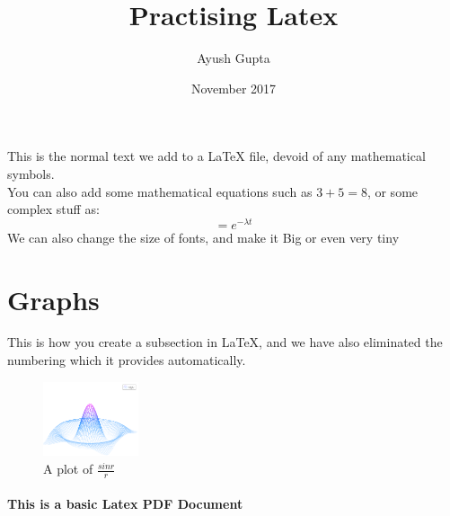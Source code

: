 \documentclass[12pt, letterpaper, twoside]{article}
\title{Practising Latex}
\author{Ayush Gupta}
\date{November 2017}
\begin{document}
\maketitle
This is the normal text we add to a \LaTeX{} file, devoid of any mathematical symbols. \\
You can also add some mathematical equations such as $3+5=8$, or some complex stuff as:
\begin{equation} [M]=e^{-\lambda t} \end{equation}
We can also change the size of fonts, and make it {\huge Big} or even very {\tiny tiny}\\
\section*{Graphs}
This is how you create a subsection in \LaTeX{}, and we have also eliminated the numbering which it provides automatically. 
\begin{figure}[h]
    \centering
    \includegraphics[width=0.25\textwidth]{mesh}
    \caption{A plot of $\frac{sin r}{r}$}
    \label{fig:mesh1}
\end{figure}
\paragraph{This is a basic Latex PDF Document}
\end{document}
